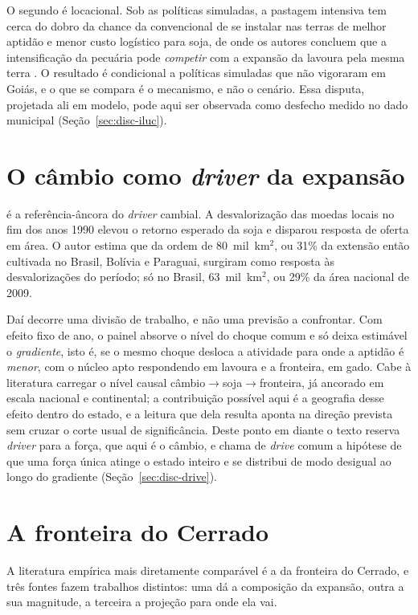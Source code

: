 O segundo é locacional. Sob as políticas simuladas, a pastagem intensiva tem
cerca do dobro da chance da convencional de se instalar nas terras de melhor
aptidão e menor custo logístico para soja, de onde os autores concluem que a
intensificação da pecuária pode \emph{competir} com a expansão da lavoura pela
mesma terra \cite[p.~7238]{Cohn2014}. O resultado é condicional a políticas
simuladas que não vigoraram em Goiás, e o que se compara é o mecanismo, e não o
cenário. Essa disputa, projetada ali em modelo, pode aqui ser observada como
desfecho medido no dado municipal (Seção~\ref{sec:disc-iluc}).

\section{O câmbio como \emph{driver} da expansão}
\label{sec:ref-cambio}

 é a referência-âncora do \emph{driver} cambial. A
desvalorização das moedas locais no fim dos anos 1990 elevou o retorno
esperado da soja e disparou resposta de oferta em área. O autor estima que
da ordem de 80~mil~km$^2$, ou 31\% da extensão então cultivada no Brasil,
Bolívia e Paraguai, surgiram como resposta às desvalorizações do período; só
no Brasil, 63~mil~km$^2$, ou 29\% da área nacional de 2009.

Daí decorre uma divisão de trabalho, e não uma previsão a confrontar. Com
efeito fixo de ano, o painel absorve o nível do choque comum e só deixa
estimável o \emph{gradiente}, isto é, se o mesmo choque desloca a atividade
para onde a aptidão é \emph{menor}, com o núcleo apto respondendo em lavoura e
a fronteira, em gado. Cabe à literatura carregar o nível causal
câmbio$\to$soja$\to$fronteira, já ancorado em escala nacional e continental; a
contribuição possível aqui é a geografia desse efeito dentro do estado, e a
leitura que dela resulta aponta na direção prevista sem cruzar o corte usual de
significância. Deste ponto em
diante o texto reserva \emph{driver} para a força, que aqui é o câmbio, e
chama de \emph{drive} comum a hipótese de que uma força única atinge o estado
inteiro e se distribui de modo desigual ao longo do gradiente
(Seção~\ref{sec:disc-drive}).

\section{A fronteira do Cerrado}
\label{sec:ref-matopiba}

A literatura empírica mais diretamente comparável é a da fronteira do Cerrado,
e três fontes fazem trabalhos distintos: uma dá a composição da
expansão, outra a sua magnitude, a terceira a projeção para onde ela vai.

